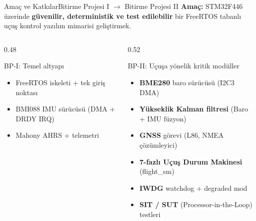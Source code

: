 \begin{frame}{Amaç ve Katkılar}{Bitirme Projesi I $\rightarrow$ Bitirme Projesi II}
  \textbf{Amaç:} STM32F446 üzerinde \textbf{güvenilir, deterministik ve test edilebilir}
  bir FreeRTOS tabanlı uçuş kontrol yazılım mimarisi geliştirmek.
  \vspace{4pt}
  \begin{columns}[T]
    \begin{column}{0.48\textwidth}
      \begin{block}{BP-I: Temel altyapı}
        \begin{itemize}
          \item FreeRTOS iskeleti + tek giriş noktası
          \item BMI088 IMU sürücüsü (DMA + DRDY IRQ)
          \item Mahony AHRS + telemetri
        \end{itemize}
      \end{block}
    \end{column}
    \begin{column}{0.52\textwidth}
      \begin{exampleblock}{BP-II: Uçuşa yönelik kritik modüller}
        \begin{itemize}
          \item \textbf{BME280} baro sürücüsü (I2C3 DMA)
          \item \textbf{Yükseklik Kalman filtresi} (Baro + IMU füzyon)
          \item \textbf{GNSS} görevi (L86, NMEA çözümleyici)
          \item \textbf{7-fazlı Uçuş Durum Makinesi} (flight\_sm)
          \item \textbf{IWDG} watchdog + degraded mod
          \item \textbf{SIT / SUT} (Processor-in-the-Loop) testleri
        \end{itemize}
      \end{exampleblock}
    \end{column}
  \end{columns}
\end{frame}
